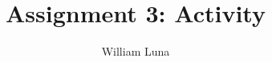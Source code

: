 \documentclass[
	letterpaper, %
]{jdf}
\author{William Luna}
\title{Assignment 3: Activity}
\begin{document}
\newcommand{\pcite}[1]{(\cite{#1})}

\maketitle



\end{document}
